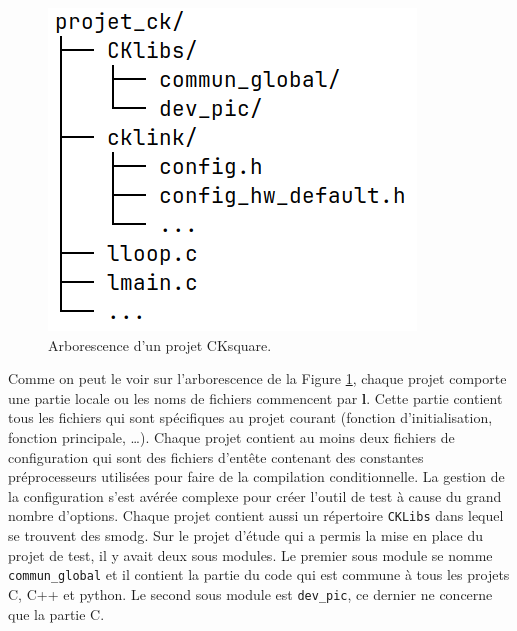 \documentclass[a4paper]{article}
\begin{document}
\pagebreak
\begin{figure}[h!]
  \begin{center}
    \includegraphics[scale=0.5]{./img/arborescence-proj.png}
    \caption{Arborescence d'un projet CKsquare.}
    \label{fig:arbrprojck}
  \end{center}
\end{figure}

Comme on peut le voir sur l'arborescence de la Figure \ref{fig:arbrprojck},
chaque projet comporte une partie locale ou les noms de fichiers commencent par
\textbf{l}. Cette partie contient tous les fichiers qui sont spécifiques au
projet courant (fonction d'initialisation, fonction principale, \dots). Chaque
projet contient au moins deux fichiers de configuration qui sont des fichiers
d'entête contenant des constantes préprocesseurs utilisées pour faire de la
compilation conditionnelle. La gestion de la configuration s'est avérée complexe
pour créer l'outil de test à cause du grand nombre d'options. Chaque projet
contient aussi un répertoire \verb|CKLibs| dans lequel se trouvent des
\gls{smodg}. Sur le projet d'étude qui a permis la mise en place du projet de
test, il y avait deux sous modules. Le premier sous module se nomme
\verb|commun_global| et il contient la partie du code qui est commune à tous les
projets C, C++ et python. Le second sous module est \verb|dev_pic|, ce dernier ne
concerne que la partie C.
\end{document}
